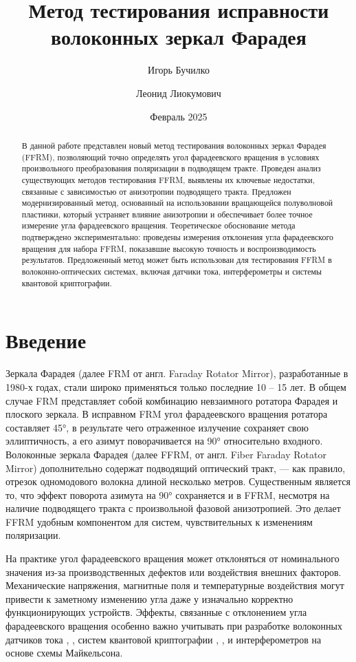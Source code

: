 \documentclass{article}
\title{Метод тестирования исправности волоконных зеркал Фарадея}
\author[1]{Игорь Бучилко}
\author[1]{Леонид Лиокумович}
\affil[1]{Санкт-Петербургский политехнический Университет Петра Великого}
\date{Февраль 2025}
\begin{document}
	
\maketitle
\begin{abstract}
В данной работе представлен новый метод тестирования волоконных зеркал Фарадея (FFRM), позволяющий точно определять угол фарадеевского вращения в условиях произвольного преобразования поляризации в подводящем тракте.
Проведен анализ существующих методов тестирования FFRM, выявлены их ключевые недостатки, связанные с зависимостью от анизотропии подводящего тракта.
Предложен модернизированный метод, основанный на использовании вращающейся полуволновой пластинки, который устраняет влияние анизотропии и обеспечивает более точное измерение угла фарадеевского вращения.
Теоретическое обоснование метода подтверждено экспериментально: проведены измерения отклонения угла фарадеевского вращения для набора FFRM, показавшие высокую точность и воспроизводимость результатов.
Предложенный метод может быть использован для тестирования FFRM в волоконно-оптических системах, включая датчики тока, интерферометры и системы квантовой криптографии.
\end{abstract}

\section{Введение}
Зеркала Фарадея (далее FRM от англ. Faraday Rotator Mirror), разработанные в 1980-х годах, стали широко применяться только последние 10 – 15 лет.
В общем случае FRM представляет собой комбинацию невзаимного ротатора Фарадея и плоского зеркала\autocite{paschottaFaradayMirrors2022}.
В исправном FRM угол фарадеевского вращения ротатора составляет 45°, в результате чего отраженное излучение сохраняет свою эллиптичность, а его азимут поворачивается на 90° относительно входного.
Волоконные зеркала Фарадея (далее FFRM, от англ. Fiber Faraday Rotator Mirror) дополнительно содержат подводящий оптический тракт, — как правило, отрезок одномодового волокна длиной несколько метров.
Существенным является то, что эффект поворота азимута на 90° сохраняется и в FFRM, несмотря на наличие подводящего тракта с произвольной фазовой анизотропией.
Это делает FFRM удобным компонентом для систем, чувствительных к изменениям поляризации.

На практике угол фарадеевского вращения может отклоняться от номинального значения из-за производственных дефектов или воздействия внешних факторов.
Механические напряжения, магнитные поля и температурные воздействия могут привести к заметному изменению угла даже у изначально корректно функционирующих устройств.
Эффекты, связанные с отклонением угла фарадеевского вращения особенно важно учитывать при разработке волоконных датчиков тока \autocite{karabulutEffectFaradayMirror2019}, \autocite{wuInfluenceImperfectFaraday2022}, систем квантовой криптографии \autocite{wangEffectImperfectFaraday2013}, \autocite{sunPassiveFaradaymirrorAttack2011}, \autocite{liangSecurityAnalysisContinuousvariable2019} и интерферометров на основе схемы Майкельсона.
\end{document}
